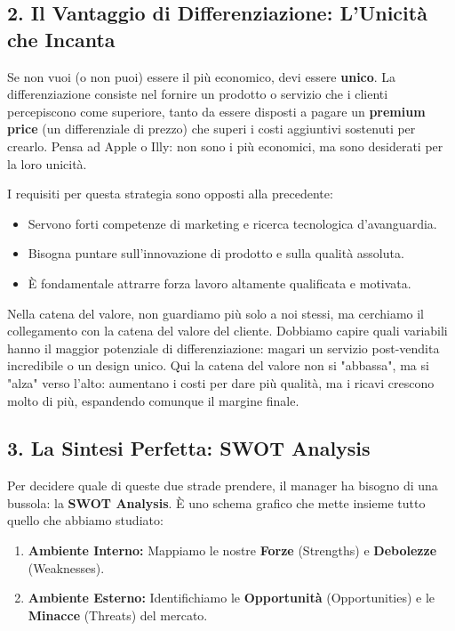 \documentclass[a4paper,10pt]{article}
\begin{document}
\subsection*{2. Il Vantaggio di Differenziazione: L'Unicità che Incanta}

Se non vuoi (o non puoi) essere il più economico, devi essere \textbf{unico}. La differenziazione consiste nel fornire un prodotto o servizio che i clienti percepiscono come superiore, tanto da essere disposti a pagare un \textbf{premium price} (un differenziale di prezzo) che superi i costi aggiuntivi sostenuti per crearlo. Pensa ad Apple o Illy: non sono i più economici, ma sono desiderati per la loro unicità.

I requisiti per questa strategia sono opposti alla precedente:
\begin{itemize}
    \item Servono forti competenze di marketing e ricerca tecnologica d'avanguardia.
    \item Bisogna puntare sull'innovazione di prodotto e sulla qualità assoluta.
    \item È fondamentale attrarre forza lavoro altamente qualificata e motivata.
\end{itemize}

Nella catena del valore, non guardiamo più solo a noi stessi, ma cerchiamo il collegamento con la catena del valore del cliente. Dobbiamo capire quali variabili hanno il maggior potenziale di differenziazione: magari un servizio post-vendita incredibile o un design unico. Qui la catena del valore non si "abbassa", ma si "alza" verso l'alto: aumentano i costi per dare più qualità, ma i ricavi crescono molto di più, espandendo comunque il margine finale.

\subsection*{3. La Sintesi Perfetta: SWOT Analysis}

Per decidere quale di queste due strade prendere, il manager ha bisogno di una bussola: la \textbf{SWOT Analysis}. È uno schema grafico che mette insieme tutto quello che abbiamo studiato:
\begin{enumerate}
    \item \textbf{Ambiente Interno:} Mappiamo le nostre \textbf{Forze} (Strengths) e \textbf{Debolezze} (Weaknesses).
    \item \textbf{Ambiente Esterno:} Identifichiamo le \textbf{Opportunità} (Opportunities) e le \textbf{Minacce} (Threats) del mercato.
\end{enumerate}
\end{document}
